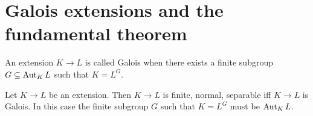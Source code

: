 \documentclass{article}
\begin{document}


\section{Galois extensions and the fundamental theorem}

\begin{dfn}
  An extension $K \to L$ is called Galois
  when there exists a finite subgroup $G \subseteq \operatorname{Aut}_K L$
  such that $K = L^G$.
\end{dfn}

\begin{prop}
  Let $K \to L$ be an extension.
  Then $K \to L$ is finite, normal, separable
  iff $K \to L$ is Galois.
  In this case the finite subgroup $G$ such that $K = L^G$
  must be $\operatorname{Aut}_K L$.
\end{prop}


  


\end{document}
